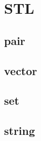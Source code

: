 \chapter{STL}

\begin{center}
\end{center}

\section{pair}


\section{vector}


\section{set}


\section{string}
